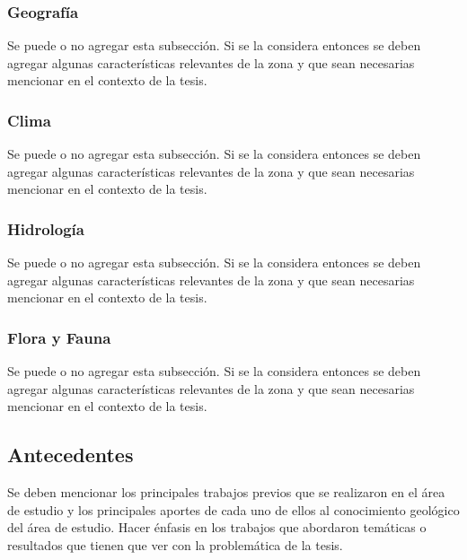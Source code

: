             \subsubsection{Geografía}
             Se puede o no agregar esta subsección. Si se la considera entonces se deben agregar algunas características relevantes de la zona y que sean necesarias mencionar en el contexto de la tesis. 
            \subsubsection{Clima}
             Se puede o no agregar esta subsección. Si se la considera entonces se deben agregar algunas características relevantes de la zona y que sean necesarias mencionar en el contexto de la tesis. 
            \subsubsection{Hidrología}
            Se puede o no agregar esta subsección. Si se la considera entonces se deben agregar algunas características relevantes de la zona y que sean necesarias mencionar en el contexto de la tesis. 
            \subsubsection{Flora y Fauna}
            Se puede o no agregar esta subsección. Si se la considera entonces se deben agregar algunas características relevantes de la zona y que sean necesarias mencionar en el contexto de la tesis. 
        \subsection{\large Antecedentes}
            Se deben mencionar los principales trabajos previos que se realizaron en el área de estudio y los principales aportes de cada uno de ellos al conocimiento geológico del área de estudio. Hacer énfasis en los trabajos que abordaron temáticas o resultados que tienen que ver con la problemática de la tesis.
